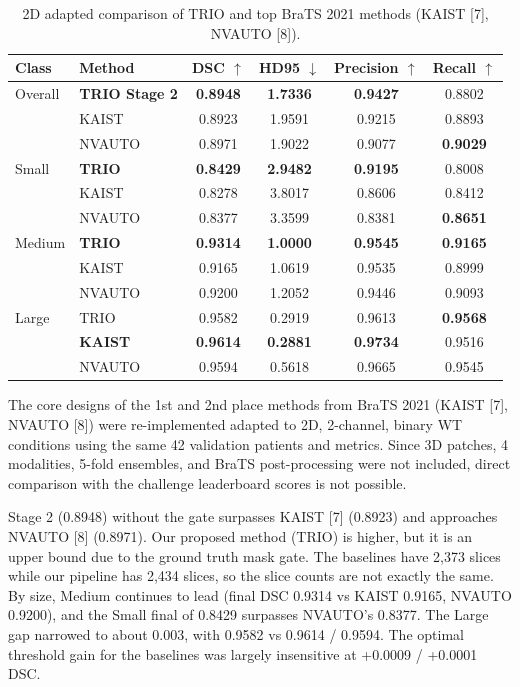 \documentclass[11pt,a4paper]{article}
\begin{document}
\begin{table}[htbp]
    \centering
    \caption{2D adapted comparison of TRIO and top BraTS 2021 methods (KAIST [7], NVAUTO [8]).}
    \begin{tabular}{llcccc}
        \toprule
        Class & Method & DSC $\uparrow$ & HD95 $\downarrow$ & Precision $\uparrow$ & Recall $\uparrow$ \\
        \midrule
        Overall & \textbf{TRIO Stage 2} & \textbf{0.8948} & \textbf{1.7336} & \textbf{0.9427} & 0.8802 \\
         & KAIST & 0.8923 & 1.9591 & 0.9215 & 0.8893 \\
         & NVAUTO & 0.8971 & 1.9022 & 0.9077 & \textbf{0.9029} \\
        \midrule
        Small & \textbf{TRIO} & \textbf{0.8429} & \textbf{2.9482} & \textbf{0.9195} & 0.8008 \\
         & KAIST & 0.8278 & 3.8017 & 0.8606 & 0.8412 \\
         & NVAUTO & 0.8377 & 3.3599 & 0.8381 & \textbf{0.8651} \\
        \midrule
        Medium & \textbf{TRIO} & \textbf{0.9314} & \textbf{1.0000} & \textbf{0.9545} & \textbf{0.9165} \\
         & KAIST & 0.9165 & 1.0619 & 0.9535 & 0.8999 \\
         & NVAUTO & 0.9200 & 1.2052 & 0.9446 & 0.9093 \\
        \midrule
        Large & TRIO & 0.9582 & 0.2919 & 0.9613 & \textbf{0.9568} \\
         & \textbf{KAIST} & \textbf{0.9614} & \textbf{0.2881} & \textbf{0.9734} & 0.9516 \\
         & NVAUTO & 0.9594 & 0.5618 & 0.9665 & 0.9545 \\
        \bottomrule
    \end{tabular}
    \label{tab:sota}
\end{table}

The core designs of the 1st and 2nd place methods from BraTS 2021 (KAIST [7], NVAUTO [8]) were re-implemented adapted to 2D, 2-channel, binary WT conditions using the same 42 validation patients and metrics. Since 3D patches, 4 modalities, 5-fold ensembles, and BraTS post-processing were not included, direct comparison with the challenge leaderboard scores is not possible.

Stage 2 (0.8948) without the gate surpasses KAIST [7] (0.8923) and approaches NVAUTO [8] (0.8971).
Our proposed method (TRIO) is higher, but it is an upper bound due to the ground truth mask gate. The baselines have 2,373 slices while our pipeline has 2,434 slices, so the slice counts are not exactly the same. By size, Medium continues to lead (final DSC 0.9314 vs KAIST 0.9165, NVAUTO 0.9200), and the Small final of 0.8429 surpasses NVAUTO's 0.8377. The Large gap narrowed to about 0.003, with 0.9582 vs 0.9614 / 0.9594. The optimal threshold gain for the baselines was largely insensitive at +0.0009 / +0.0001 DSC.
\end{document}

